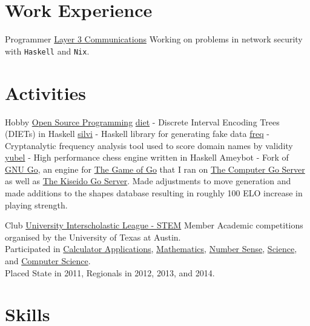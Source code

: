 \documentclass[10pt,letterpaper,sans]{moderncv}
\newcommand{\wlink}[2]{\textcolor[HTML]{0020B6}{\href{#1}{#2}}}
\begin{document}
\makecvtitle{}

\section{Work Experience}
        {Programmer}
        {\wlink{https://www.layer3com.com}{Layer 3 Communications}}
        {}{}
        {
Working on problems in network security with \texttt{Haskell} and \texttt{Nix}. 
}

\section{Activities}
        {Hobby}
        {\wlink{https://github.com/chessai}{Open Source Programming}}
        {}{}{
        \wlink{https://github.com/chessai/diet}{diet} - Discrete Interval Encoding Trees (DIETs) in Haskell 
        \wlink{https://github.com/chessai/silvi}{silvi} - Haskell library for generating fake data
        \wlink{https://github.com/chessai/freq}{freq} - Cryptanalytic frequency analysis tool used to score domain names by validity
        \wlink{https://github.com/chessai/yubel}{yubel} - High performance chess engine written in Haskell
        Ameybot - Fork of \wlink{https://www.gnu.org/software/gnugo/}{GNU Go}, an engine for \wlink{https://en.wikipedia.org/wiki/Go_(game)}{The Game of Go} that I ran on \wlink{http://yss-aya.com/cgos/}{The Computer Go Server} as well as \wlink{https://www.gokgs.com/}{The Kiseido Go Server}. Made adjustments to move generation and made additions to the shapes database resulting in roughly 100 ELO increase in playing strength. \\
}

        {Club}
        {\wlink{http://www.uiltexas.org/academics/stem}{University Interscholastic League - STEM}}
        {Member}{}{
        Academic competitions organised by the University of Texas at Austin. \\ %
        Participated in %
        \wlink{http://www.uiltexas.org/academics/stem/calculator-applications}{Calculator Applications}, %
        \wlink{http://www.uiltexas.org/academics/stem/mathematics}{Mathematics}, %
        \wlink{http://www.uiltexas.org/academics/stem/number-sense}{Number Sense}, %
        \wlink{http://www.uiltexas.org/academics/stem/science}{Science}, and %
        \wlink{http://www.uiltexas.org/academics/stem/computer-science}{Computer Science}. \\ %
        Placed State in 2011, Regionals in 2012, 2013, and 2014.
}

\vspace{1em}

\section{Skills}
\end{document}
